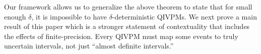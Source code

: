 \documentclass[english,reprint, aps, prl,superscriptaddress, showpacs,
showkeys, longbibliography, amsmath, amssymb, floatfix]{revtex4-1}
\theoremstyle{plain}
\theoremstyle{definition}
\newcommand{\events}{\ensuremath{\mathcal{E}}}
\newcommand{\proj}[1]{\op{#1}{#1}}
\begin{document}


Our framework allows us to generalize the above theorem to state that
for small enough $\delta$, it is impossible to have
$\delta$-deterministic QIVPMs. We next prove a main result of this
paper which is a stronger statement of contextuality that includes the
effects of finite-precision.  Every QIVPM must map some events to
truly uncertain intervals, not just ``almost definite intervals.'' 
\end{document}
